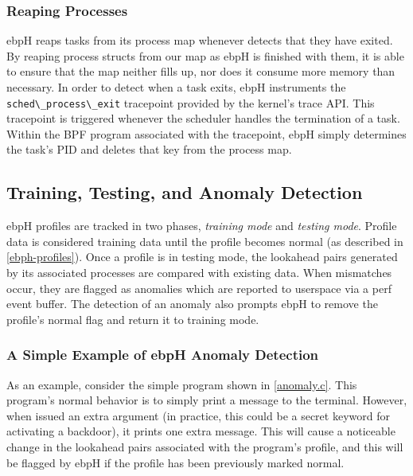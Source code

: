 \documentclass[
  12pt]{findlay}
\newcommand{\passthrough}[1]{#1}
\begin{document}
\hypertarget{reaping-processes}{%
\subsubsection{Reaping Processes}\label{reaping-processes}}

ebpH reaps tasks from its process map whenever detects that they have
exited. By reaping process structs from our map as ebpH is finished with
them, it is able to ensure that the map neither fills up, nor does it
consume more memory than necessary. In order to detect when a task
exits, ebpH instruments the
\passthrough{\lstinline!sched\_process\_exit!} tracepoint provided by
the kernel's trace API. This tracepoint is triggered whenever the
scheduler handles the termination of a task. Within the BPF program
associated with the tracepoint, ebpH simply determines the task's PID
and deletes that key from the process map.

\hypertarget{training-testing-and-anomaly-detection}{%
\subsection{Training, Testing, and Anomaly
Detection}\label{training-testing-and-anomaly-detection}}

ebpH profiles are tracked in two phases, \emph{training mode} and
\emph{testing mode}. Profile data is considered training data until the
profile becomes normal (as described in \autoref{ebph-profiles}). Once a
profile is in testing mode, the lookahead pairs generated by its
associated processes are compared with existing data. When mismatches
occur, they are flagged as anomalies which are reported to userspace via
a perf event buffer. The detection of an anomaly also prompts ebpH to
remove the profile's normal flag and return it to training mode.

\hypertarget{a-simple-example-of-ebph-anomaly-detection}{%
\subsubsection{A Simple Example of ebpH Anomaly
Detection}\label{a-simple-example-of-ebph-anomaly-detection}}

As an example, consider the simple program shown in \autoref{anomaly.c}.
This program's normal behavior is to simply print a message to the
terminal. However, when issued an extra argument (in practice, this
could be a secret keyword for activating a backdoor), it prints one
extra message. This will cause a noticeable change in the lookahead
pairs associated with the program's profile, and this will be flagged by
ebpH if the profile has been previously marked normal.
\end{document}

